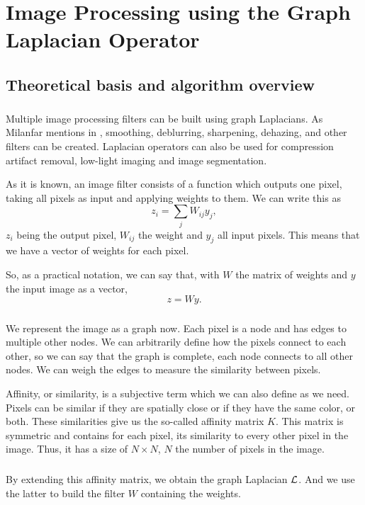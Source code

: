 \chapter{Image Processing using the Graph Laplacian Operator}

\section{Theoretical basis and algorithm overview}

\paragraph{}
Multiple image processing filters can be built using graph Laplacians.
As Milanfar mentions in \cite{siam_slides_2016}, smoothing, deblurring, sharpening, dehazing, and other filters can be created.
Laplacian operators can also be used for compression artifact removal, low-light imaging and image segmentation.

As it is known, an image filter consists of a function which outputs one pixel, taking all pixels as input and applying weights to them. We can write this as
\[z_i = \sum_j W_{ij}y_j,\]
\(z_i\) being the output pixel, \(W_{ij}\) the weight and \(y_j\) all input pixels.
This means that we have a vector of weights for each pixel.

So, as a practical notation, we can say that, with \(W\) the matrix of weights and \(y\) the input image as a vector,
\[z = Wy.\]

\paragraph{}
We represent the image as a graph now.
Each pixel is a node and has edges to multiple other nodes.
We can arbitrarily define how the pixels connect to each other, so we can say that the graph is complete, each node connects to all other nodes.
We can weigh the edges to measure the similarity between pixels.

Affinity, or similarity, is a subjective term which we can also define as we need.
Pixels can be similar if they are spatially close or if they have the same color, or both.
These similarities give us the so-called affinity matrix \(K\).
This matrix is symmetric and contains for each pixel, its similarity to every other pixel in the image.
Thus, it has a size of \(N \times N\), \(N\) the number of pixels in the image.

\paragraph{}
By extending this affinity matrix, we obtain the graph Laplacian \(\operatorname{\mathcal{L}}\).
And we use the latter to build the filter \(W\) containing the weights.

